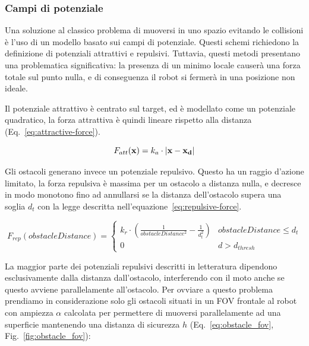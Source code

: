 \documentclass[a4paper]{article}
\begin{document}
	\subsubsection{Campi di potenziale}\label{subsec:Campi-di-potenziale}
	
	Una soluzione al classico problema di muoversi in uno spazio evitando le
	collisioni è l'uso di un modello basato sui campi di potenziale. Questi
	schemi richiedono la definizione di potenziali attrattivi e repulsivi.
	Tuttavia, questi metodi presentano una problematica significativa: la
	presenza di un minimo locale causerà una forza totale sul punto nulla, e di
	conseguenza il robot si fermerà in una posizione non ideale. 
	
	Il potenziale attrattivo è centrato sul target, ed è modellato come un
	potenziale quadratico, la forza attrattiva è quindi lineare rispetto alla
	distanza (Eq.~\ref{eq:attractive-force}).

	\begin{equation}\label{eq:attractive-force}
		F_{att}( \textbf{x}) = k_a\cdot \left| {\bf x - x_d} \right| 
	\end{equation}


	Gli ostacoli generano invece un potenziale repulsivo. Questo ha un raggio
	d'azione limitato, la forza repulsiva è massima per un ostacolo a distanza
	nulla, e decresce in modo monotono fino ad annullarsi se la distanza
	dell'ostacolo supera una soglia $d_t$ con la legge descritta
	nell'equazione~\ref{eq:repulsive-force}.

	\begin{equation}\label{eq:repulsive-force}
		F_{rep}(obstacleDistance) = \begin{cases}
			k_r \cdot \left(
				\frac{1}{obstacleDistance^2}-
				\frac{1}{d_t^2}
			\right)  & obstacleDistance \leq d_{t} \\
			0 & d > d_{thresh}
		\end{cases}
	\end{equation}

	La maggior parte dei potenziali repulsivi descritti in letteratura
	dipendono esclusivamente dalla distanza dall'ostacolo, interferendo con il
	moto anche se questo avviene parallelamente all'ostacolo. Per ovviare a
	questo problema prendiamo in considerazione solo gli ostacoli situati in un
	FOV frontale al robot con ampiezza $ \alpha  $ calcolata per permettere di
	muoversi parallelamente ad una superficie mantenendo una distanza di
	sicurezza $ h $ (Eq.~\ref{eq:obstacle_fov}, Fig.~\ref{fig:obstacle_fov}): 
\end{document}
